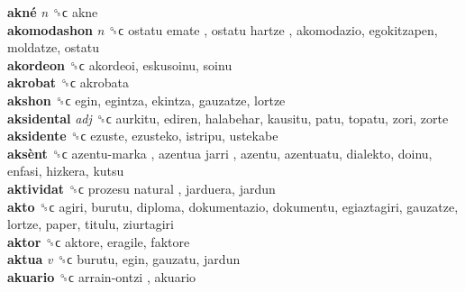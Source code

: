 \textbf{akné} \emph{n}  ␝ϲ  akne  \\
\textbf{akomodashon} \emph{n}  ␝ϲ   ostatu emate ,  ostatu hartze , akomodazio, egokitzapen, moldatze, ostatu  \\
\textbf{akordeon} ␝ϲ  akordeoi, eskusoinu, soinu  \\
\textbf{akrobat} ␝ϲ  akrobata  \\
\textbf{akshon} ␝ϲ  egin, egintza, ekintza, gauzatze, lortze  \\
\textbf{aksidental} \emph{adj}  ␝ϲ  aurkitu, ediren, halabehar, kausitu, patu, topatu, zori, zorte  \\
\textbf{aksidente} ␝ϲ  ezuste, ezusteko, istripu, ustekabe  \\
\textbf{aksènt} ␝ϲ   azentu-marka ,  azentua jarri , azentu, azentuatu, dialekto, doinu, enfasi, hizkera, kutsu  \\
\textbf{aktividat} ␝ϲ   prozesu natural , jarduera, jardun  \\
\textbf{akto} ␝ϲ  agiri, burutu, diploma, dokumentazio, dokumentu, egiaztagiri, gauzatze, lortze, paper, titulu, ziurtagiri  \\
\textbf{aktor} ␝ϲ  aktore, eragile, faktore  \\
\textbf{aktua} \emph{v}  ␝ϲ  burutu, egin, gauzatu, jardun  \\
\textbf{akuario} ␝ϲ   arrain-ontzi , akuario  \\
